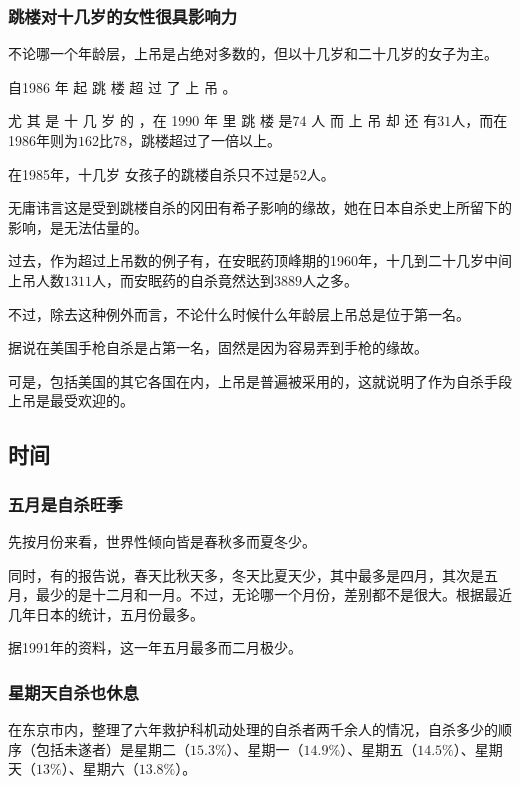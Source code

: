 \documentclass[UTF8]{ctexart}
\begin{document}
\subsubsection*{跳楼对十几岁的女性很具影响力}

不论哪一个年龄层，上吊是占绝对多数的，但以十几岁和二十几岁的女子为主。

自1986 年 起 跳 楼 超 过 了 上 吊 。

尤 其 是 十 几 岁 的 ，在 1990 年 里 跳 楼 是$74$ 人 而 上 吊 却 还 有$31$人，而在1986年则为$162$比$78$，跳楼超过了一倍以上。

在1985年，十几岁 女孩子的跳楼自杀只不过是$52$人。

无庸讳言这是受到跳楼自杀的冈田有希子影响的缘故，她在日本自杀史上所留下的影响，是无法估量的。

过去，作为超过上吊数的例子有，在安眠药顶峰期的1960年，十几到二十几岁中间上吊人数$1311$人，而安眠药的自杀竟然达到$3889$人之多。

不过，除去这种例外而言，不论什么时候什么年龄层上吊总是位于第一名。

据说在美国手枪自杀是占第一名，固然是因为容易弄到手枪的缘故。

可是，包括美国的其它各国在内，上吊是普遍被采用的，这就说明了作为自杀手段上吊是最受欢迎的。

\subsection{时间}

\subsubsection*{五月是自杀旺季}

先按月份来看，世界性倾向皆是春秋多而夏冬少。

同时，有的报告说，春天比秋天多，冬天比夏天少，其中最多是四月，其次是五月，最少的是十二月和一月。不过，无论哪一个月份，差别都不是很大。根据最近几年日本的统计，五月份最多。

据1991年的资料，这一年五月最多而二月极少。

\subsubsection*{星期天自杀也休息}

在东京市内，整理了六年救护科机动处理的自杀者两千余人的情况，自杀多少的顺序（包括未遂者）是星期二（$15.3\%$）、星期一（$14.9\%$）、星期五（$14.5\%$）、星期天（$13\%$）、星期六（$13.8\%$）。
\end{document}
